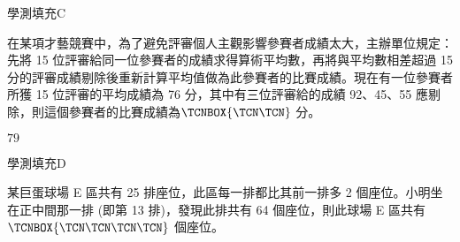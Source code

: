 \begin{QUESTIONS}
\begin{QUESTION}
\begin{QSOLLIST}
        \end{QSOLLIST}
        \begin{QEMPTYSPACE}
        \end{QEMPTYSPACE}
    \end{QUESTION}
    \begin{QUESTION}
        \begin{ExamInfo}{96}{學測}{填充}{C}
        \end{ExamInfo}
        \begin{ExamAnsRateInfo}{66}{93}{76}{29}
        \end{ExamAnsRateInfo}
        \begin{QBODY}
            在某項才藝競賽中，為了避免評審個人主觀影響參賽者成績太大，主辦單位規定：先將 15 位評審給同一位參賽者的成績求得算術平均數，再將與平均數相差超過 15 分的評審成績剔除後重新計算平均值做為此參賽者的比賽成績。現在有一位參賽者所獲 15 位評審的平均成績為 76 分，其中有三位評審給的成績 92、45、55 應剔除，則這個參賽者的比賽成績為$\TCNBOX{\TCN\TCN}$ 分。
        \end{QBODY}
        \begin{QFROMS}
        \end{QFROMS}
        \begin{QTAGS}\end{QTAGS}
        \begin{QANS}
            $79$
        \end{QANS}
        \begin{QSOLLIST}
        \end{QSOLLIST}
        \begin{QEMPTYSPACE}
        \end{QEMPTYSPACE}
    \end{QUESTION}
    \begin{QUESTION}
        \begin{ExamInfo}{96}{學測}{填充}{D}
        \end{ExamInfo}
        \begin{ExamAnsRateInfo}{75}{92}{82}{51}
        \end{ExamAnsRateInfo}
        \begin{QBODY}
            某巨蛋球場 E 區共有 25 排座位，此區每一排都比其前一排多 2 個座位。小明坐在正中間那一排 (即第 13 排)，發現此排共有 64 個座位，則此球場 E 區共有$\TCNBOX{\TCN\TCN\TCN\TCN}$ 個座位。
        \end{QBODY}
        \begin{QFROMS}
        \end{QFROMS}

\end{QUESTION}
\end{QUESTIONS}
